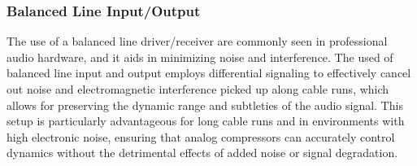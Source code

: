 \documentclass[10pt]{article}
\begin{document}
\begin{multicols*}{2}
\begin{minipage}{\linewidth}

                        \label{fig:pwr-mng}

                    \end{minipage}

                \subsubsection{Balanced Line Input/Output}
                    The use of a balanced line driver/receiver are commonly seen in professional audio hardware, and it aids in minimizing noise and interference. The used of balanced line input and output employs differential signaling to effectively cancel out noise and electromagnetic interference picked up along cable runs, which allows  for preserving the dynamic range and subtleties of the audio signal. This setup is particularly advantageous for long cable runs and in environments with high electronic noise, ensuring that analog compressors can accurately control dynamics without the detrimental effects of added noise or signal degradation.\par


\end{multicols*}
\end{document}
